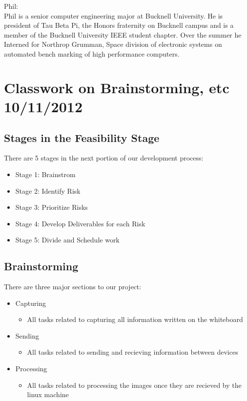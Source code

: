 \documentclass[]{article}
\begin{document}
	Phil: \\
	Phil is a senior computer engineering major at Bucknell University. He is president of Tau Beta Pi, the Honors fraternity on Bucknell campus and is a member of the Bucknell University  IEEE student chapter. Over the summer he Interned for Northrop Grumman, Space division of electronic systems on automated bench marking of high performance computers. \\
	
	\section{Classwork on Brainstorming, etc 10/11/2012}
		\subsection{Stages in the Feasibility Stage}
			There are 5 stages in the next  portion of our development process:
			\begin{itemize}
				\item Stage 1: Brainstrom
				\item Stage 2: Identify Risk
				\item Stage 3: Prioritize Risks
				\item Stage 4: Develop Deliverables for each Risk
				\item Stage 5: Divide and Schedule work
			\end{itemize}
			
			\subsection{Brainstorming}
			There are three major sections to our project:
				\begin{itemize}
					\item Capturing
					\begin{itemize}
						\item All tasks related to capturing all information written on the whiteboard
					\end{itemize}
					\item Sending
					\begin{itemize}
						\item All tasks related to sending and recieving information between devices
					\end{itemize}
					\item Processing
					\begin{itemize}
						\item All tasks related to processing the images once they are recieved by the linux machine
					\end{itemize}
				\end{itemize}
			
\end{document}
